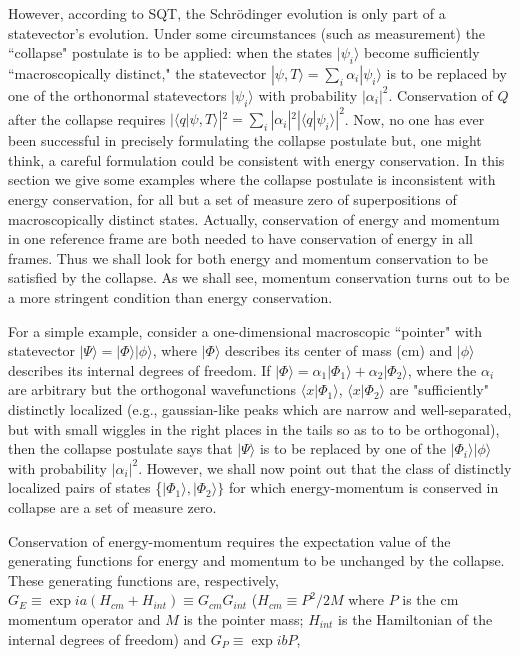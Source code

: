 \documentclass[12pt]{article}
\begin{document}
	However, according to SQT, the Schr\"odinger evolution is only part of a statevector's evolution.  
Under some circumstances (such as measurement) the ``collapse" postulate is to be applied: when
the states $|\psi_{i}\rangle$ become sufficiently ``macroscopically distinct," 
the statevector $|\psi,T\rangle=\sum_{i}\alpha_{i}|\psi_{i}\rangle$ is to be 
replaced by one of the orthonormal statevectors $|\psi_{i}\rangle$ with probability $|\alpha_{i}|^{2}$. 
Conservation of $Q$ after the collapse requires 
$|\langle q|\psi,T\rangle|^{2}=\sum_{i}|\alpha_{i}|^{2}|\langle q|\psi_{i}\rangle|^{2}$.  
Now, no one has ever been successful
 in precisely formulating the collapse postulate but, one 
might think, a careful formulation could be consistent with energy conservation.  In this section 
we give some examples where the collapse postulate is inconsistent with energy conservation, for all but a 
set of measure zero of superpositions of macroscopically distinct states. 
Actually, conservation of energy and momentum in one reference frame are both needed to have conservation 
of energy in all frames. Thus we shall look for both energy and momentum conservation 
to be satisfied by the collapse.  As we shall see, momentum conservation turns out to be 
a more stringent condition than energy conservation.  

	For a simple example, consider a 
one-dimensional macroscopic ``pointer" with statevector $|\Psi\rangle=|\Phi\rangle|\phi\rangle$, where 
$|\Phi\rangle$ describes its center of mass (cm) and $|\phi\rangle$ describes its internal degrees of freedom.
If $|\Phi\rangle=\alpha_{1}|\Phi_{1}\rangle +\alpha_{2}|\Phi_{2}\rangle$, where the $\alpha_{i}$ are arbitrary 
but the orthogonal wavefunctions $\langle x |\Phi_{1}\rangle$, $\langle x |\Phi_{2}\rangle$ are "sufficiently" 
distinctly localized (e.g., gaussian-like peaks which are narrow and well-separated, 
but with small wiggles in the right places in the tails so as to to be orthogonal), then the collapse postulate says that 
$|\Psi\rangle$ is to be replaced by one of the $|\Phi_{i}\rangle|\phi\rangle$ with probability $|\alpha_{i}|^{2}$. 
However, we shall now point out that the class of distinctly localized pairs of states 
\{$|\Phi_{1}\rangle,|\Phi_{2}\rangle \}$ 
for which energy-momentum is conserved in collapse are a set of measure zero.  

	  Conservation of energy-momentum requires 
the expectation value of the generating functions for energy and momentum to be unchanged by the collapse.
These generating functions are, respectively, $G_{E}\equiv\exp ia(H_{cm}+H_{int})\equiv G_{cm}G_{int}$  
($H_{cm}\equiv P^{2}/2M$ where $P$ is the cm momentum operator and $M$ is the pointer mass; $H_{int}$ is the 
Hamiltonian of the internal degrees of freedom) and $G_{P}\equiv\exp ibP$, 
 
\end{document}
